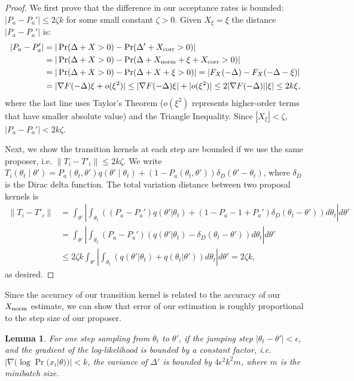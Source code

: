 \documentclass{article}
\newtheorem{lemma}{Lemma}
\begin{document}
\begin{proof}
We first prove that the difference in our acceptance rates is bounded: $|P_a - P_a'| \leq 2\zeta k$
for some small constant $\zeta > 0$. Given $X_\xi = \xi$ the distance $|P_a - P_a'|$ is:
\begin{align*}
|P_a - P_a'| &= |\Pr(\Delta + X >0) - \Pr(\Delta' + X_{\rm corr} > 0)|\\
& = | \Pr (\Delta + X > 0) - \Pr (\Delta + X_{\rm norm} + \xi + X_{\rm corr} >0) |    \\
&= |\Pr (\Delta + X > 0) -\Pr(\Delta + X + \xi >0)| = |F_X(-\Delta)- F_X(-\Delta - \xi)| \\
&= |\nabla F(-\Delta) \xi + o(\xi^2)| \leq  |\nabla F(-\Delta) \xi| +| o(\xi^2)| \leq 2|\nabla F(-\Delta)| |\xi| \leq 2k \xi,
\end{align*}
where the last line uses Taylor's Theorem ($o(\xi^2)$ represents higher-order terms that have
smaller absolute value) and the Triangle Inequality.  Since $|X_\xi| < \zeta$, $|P_a - P_a'| <
2k\zeta$.

Next, we show the transition kernels at each step are bounded if we use the same proposer, i.e.
$\|T_i - T'_i\| \leq 2k\zeta$. We write $T_i(\theta_t \mid \theta') = P_a(\theta_t, \theta')
q(\theta'\mid \theta_t) + (1-P_a(\theta_t,\theta')) \delta_D(\theta' - \theta_t)$, where $\delta_D$
is the Dirac delta function. The total variation distance between two proposal kernels is
\begin{align*}
\|T_i - T'_i \| &= \int_{\theta'} \left| \int_{\theta_t}((P_a-P_a') q(\theta'|\theta_t) + (1-P_a - 1+P_a') \delta_D(\theta_t -\theta')) d\theta_t  \right| d\theta' \\
& = \int_{\theta'} \left| \int_{\theta_t} (P_a- P_a')(q(\theta'|\theta_t) - \delta_D(\theta_t - \theta')) d\theta_t \right|  d\theta'\\ 
& \leq 2 \zeta k \int_{\theta'} \left| \int_{\theta_t}(q(\theta'|\theta_t) + q(\theta_t|\theta'))  d\theta_t \right| d\theta'= 2 \zeta k,
\end{align*}
as desired.
\end{proof}

Since the accuracy of our transition kernel is related to the accuracy of our $X_{\rm norm}$
estimate, we can show that error of our estimation is roughly proportional to the step size of our
proposer.

\begin{lemma}
For one step sampling from $\theta_t$ to $\theta'$, if the jumping step  $|\theta_t - \theta'| <
\epsilon$, and the gradient of the log-likelihood is bounded by a constant factor, i.e. $|\nabla
(\log \Pr(x_i| \theta))| < k$, the variance of $\Delta'$ is bounded by $4\epsilon^2 k^2 m$, where
$m$ is the minibatch size.
\end{lemma}
\end{document}
